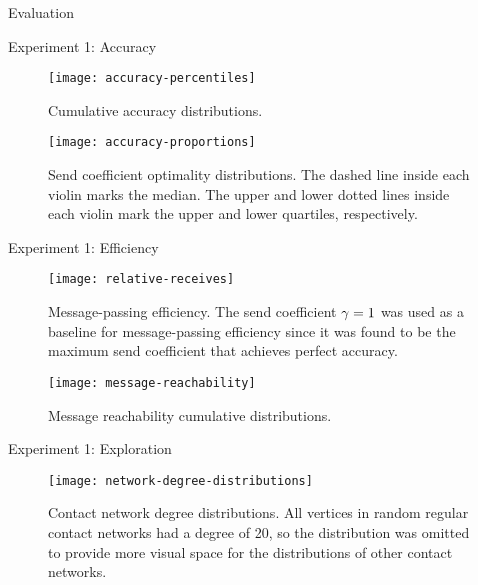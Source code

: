 \documentclass[12pt]{beamer}
\begin{document}
\begin{section}{Evaluation}

\begin{frame}[allowframebreaks]{Experiment 1: Accuracy}
  \begin{figure}
    \centering
    \texttt{[image: accuracy-percentiles]}
    \caption[Cumulative accuracy distributions]{Cumulative accuracy distributions.}
  \end{figure}

  \begin{figure}
    \centering
    \texttt{[image: accuracy-proportions]}
    \caption[Send coefficient optimality distributions]{Send coefficient optimality distributions. The dashed line inside each violin marks the median. The upper and lower dotted lines inside each violin mark the upper and lower quartiles, respectively.}
  \end{figure}
\end{frame}

\begin{frame}[allowframebreaks]{Experiment 1: Efficiency}
  \begin{figure}
    \centering
    \texttt{[image: relative-receives]}
    \caption[Message-passing efficiency]{Message-passing efficiency. The send coefficient $\gamma = 1$ was used as a baseline for message-passing efficiency since it was found to be the maximum send coefficient that achieves perfect accuracy.}
  \end{figure}

  \begin{figure}
    \centering
    \texttt{[image: message-reachability]}
    \caption[Message reachability cumulative distributions]{Message reachability cumulative distributions.}
  \end{figure}
\end{frame}

\begin{frame}[allowframebreaks]{Experiment 1: Exploration}
  \begin{figure}
    \centering
    \texttt{[image: network-degree-distributions]}
    \caption[Contact network degree distributions]{Contact network degree distributions. All vertices in random regular contact networks had a degree of 20, so the distribution was omitted to provide more visual space for the distributions of other contact networks.}
  \end{figure}
  

\end{frame}
\end{section}
\end{document}
